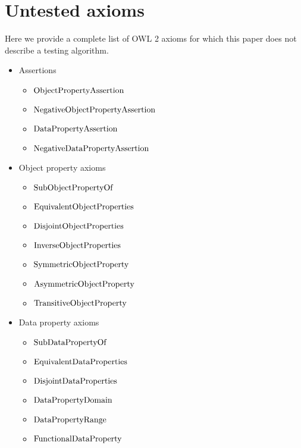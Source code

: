 \documentclass[paper.tex]{subfiles}
\begin{document}
\section{Untested axioms}
\label{app:untested}

Here we provide a complete list of OWL 2 axioms for which this paper does not describe a testing algorithm.

\begin{itemize}
  \small

  \item Assertions
  \begin{itemize}[noitemsep]
    \item $\mathrm{ObjectPropertyAssertion}$
    \item $\mathrm{NegativeObjectPropertyAssertion}$
    \item $\mathrm{DataPropertyAssertion}$
    \item $\mathrm{NegativeDataPropertyAssertion}$
  \end{itemize}

  \item Object property axioms
  \begin{itemize}[noitemsep]
    \item $\mathrm{SubObjectPropertyOf}$
    \item $\mathrm{EquivalentObjectProperties}$
    \item $\mathrm{DisjointObjectProperties}$
    \item $\mathrm{InverseObjectProperties}$
    \item $\mathrm{SymmetricObjectProperty}$
    \item $\mathrm{AsymmetricObjectProperty}$
    \item $\mathrm{TransitiveObjectProperty}$
  \end{itemize}

  \item Data property axioms
  \begin{itemize}[noitemsep]
    \item $\mathrm{SubDataPropertyOf}$
    \item $\mathrm{EquivalentDataProperties}$
    \item $\mathrm{DisjointDataProperties}$
    \item $\mathrm{DataPropertyDomain}$
    \item $\mathrm{DataPropertyRange}$
    \item $\mathrm{FunctionalDataProperty}$
  \end{itemize}


\end{itemize}
\end{document}
